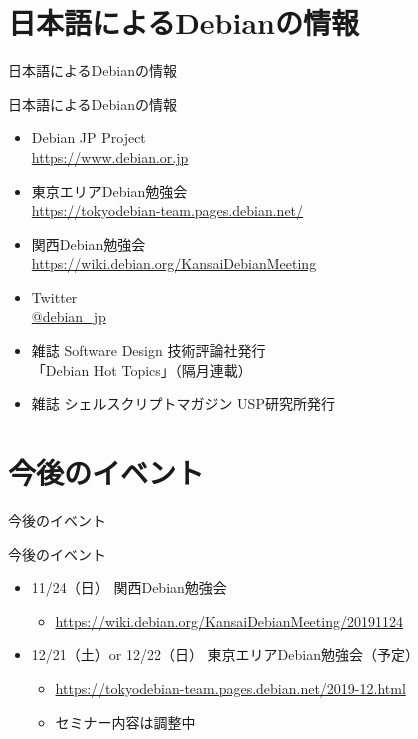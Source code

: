
\section{日本語によるDebianの情報}

\begin{frame}\begin{center}\Huge{日本語によるDebianの情報}\end{center}\end{frame}

\begin{frame}{日本語によるDebianの情報}
\begin{itemize}
  \item Debian JP Project \\
      \url{https://www.debian.or.jp}
  \item 東京エリアDebian勉強会\\
      \url{https://tokyodebian-team.pages.debian.net/}
  \item 関西Debian勉強会 \\
      \url{https://wiki.debian.org/KansaiDebianMeeting}
  \item Twitter \\
      \url{@debian_jp}
  \item 雑誌 Software Design 技術評論社発行 \\
    「Debian Hot Topics」（隔月連載）
  \item 雑誌 シェルスクリプトマガジン USP研究所発行
\end{itemize}
\end{frame}


\section{今後のイベント}

\begin{frame}\begin{center}\Huge{今後のイベント}\end{center}\end{frame}


\begin{frame}{今後のイベント}

\begin{itemize}
\item 11/24（日） 関西Debian勉強会
 \begin{itemize}
  \item \url{https://wiki.debian.org/KansaiDebianMeeting/20191124}
  \end{itemize}
\item 12/21（土）or 12/22（日） 東京エリアDebian勉強会（予定）
  \begin{itemize}
  \item \url{https://tokyodebian-team.pages.debian.net/2019-12.html}
  \item セミナー内容は調整中
  \end{itemize}
\end{itemize}

\end{frame}

